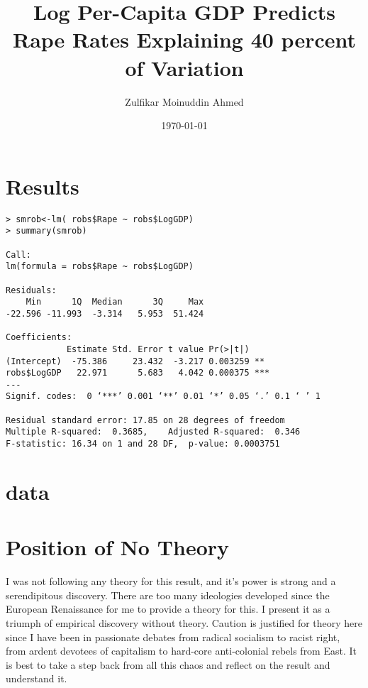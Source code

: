 \documentclass{amsart}
\title{Log Per-Capita GDP Predicts Rape Rates Explaining 40 percent of Variation}
\author{Zulfikar Moinuddin Ahmed}
\date{\today}
\begin{document}
\maketitle

\section{Results}

\begin{verbatim}
> smrob<-lm( robs$Rape ~ robs$LogGDP)
> summary(smrob)

Call:
lm(formula = robs$Rape ~ robs$LogGDP)

Residuals:
    Min      1Q  Median      3Q     Max 
-22.596 -11.993  -3.314   5.953  51.424 

Coefficients:
            Estimate Std. Error t value Pr(>|t|)    
(Intercept)  -75.386     23.432  -3.217 0.003259 ** 
robs$LogGDP   22.971      5.683   4.042 0.000375 ***
---
Signif. codes:  0 ‘***’ 0.001 ‘**’ 0.01 ‘*’ 0.05 ‘.’ 0.1 ‘ ’ 1

Residual standard error: 17.85 on 28 degrees of freedom
Multiple R-squared:  0.3685,	Adjusted R-squared:  0.346 
F-statistic: 16.34 on 1 and 28 DF,  p-value: 0.0003751
\end{verbatim}

\section{data}


\section{Position of No Theory}

I was not following any theory for this result, and it's power is strong and a serendipitous discovery.  There are too many ideologies developed since the European Renaissance for me to provide a theory for this.  I present it as a triumph of empirical discovery without theory.  Caution is justified for theory here since I have been in passionate debates from radical socialism to racist right, from ardent devotees of capitalism to hard-core anti-colonial rebels from East.  It is best to take a step back from all this chaos and reflect on the result and understand it.
\end{document}
